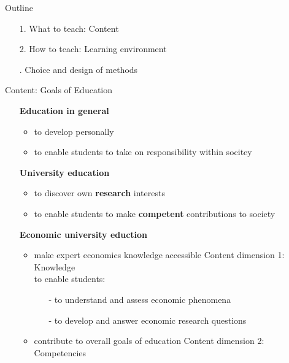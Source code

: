 \begin{frame}{Outline}
\begin{itemize}[<+->]
	\item[1.] What to teach: Content 
	\item[2.] How to teach: Learning environment
	\item[\ar 3.] Choice and design of methods
\end{itemize}
\end{frame}
\begin{frame}{Content: Goals of Education}
	\pause
	\centering
	\vspace{-4mm}
	\begin{itemize}[<+->]
\item[] \hspace{-10mm} \centering \textbf{Education in general}
\begin{itemize}
	\item  to develop personally 
	\item to enable students to take on responsibility within socitey %
\end{itemize}
\vspace{2mm}
\item[] \hspace{-9.4mm} \centering \textbf{University education}
\begin{itemize}
	\item to discover own \textbf{research} interests 
	\item to enable students to make \textbf{competent} contributions to society
\end{itemize}
\vspace{2mm}
\item[] \hspace{-10mm} \centering \textbf{Economic university eduction}
\begin{itemize}
	\item make expert economics knowledge accessible \ar \alert{Content dimension 1: Knowledge}\\
	to enable students:
	\begin{itemize}
		\item[-] to understand and assess economic phenomena %
		\item[-] to develop and answer economic research questions
	\end{itemize}
	\item contribute to overall goals of education \ar \alert{Content dimension 2: Competencies}
\end{itemize}
	\end{itemize}
\end{frame}


